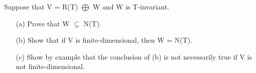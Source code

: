 Suppose that V = R(T) $\bigoplus$ W and W is T-invariant.

\begin{enumerate}
	\item[(a)] Prove that W $\subseteq$ N(T).
	\item[(b)] Show that if V is finite-dimensional, then W = N(T).
	\item[(c)] Show by example that the conclusion of (b) is not necessarily true if V is not finite-dimensional.
\end{enumerate}

\begin{tcolorbox}
\begin{solution}
	
\end{solution}

\end{tcolorbox}